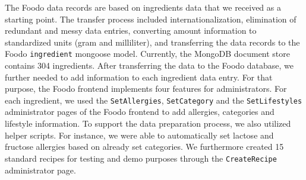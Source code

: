 
The Foodo data records are based on ingredients data that we received as a starting point. The transfer process included internationalization, elimination of redundant and messy data entries, converting amount information to standardized units (gram and milliliter), and transferring the data records to the Foodo \texttt{ingredient} mongoose model. Currently, the MongoDB document store contains 304 ingredients. After transferring the data to the Foodo database, we further needed to add information to each ingredient data entry. For that purpose, the Foodo frontend implements four features for administrators. For each ingredient, we used the \texttt{SetAllergies}, \texttt{SetCategory} and the \texttt{SetLifestyles} administrator pages of the Foodo frontend to add allergies, categories and lifestyle information. To support the data preparation process, we also utilized helper scripts. For instance, we were able to automatically set lactose and fructose allergies based on already set categories. We furthermore created 15 standard recipes for testing and demo purposes through the \texttt{CreateRecipe} administrator page.